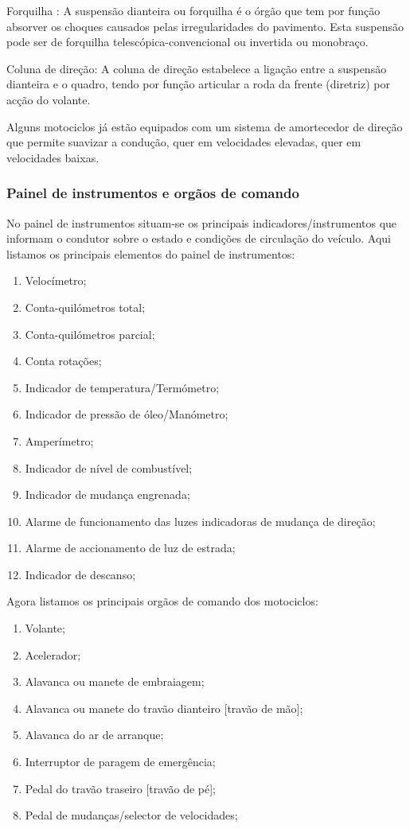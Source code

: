 \documentclass{report}
\begin{document}
Forquilha : A suspensão dianteira ou forquilha  é o órgão que tem por  função absorver os choques causados pelas irregularidades do pavimento.  Esta suspensão pode ser de forquilha  telescópica-convencional ou invertida ou monobraço.

Coluna de direção: A coluna  de direção  estabelece a ligação  entre a suspensão dianteira  e o quadro, tendo por função articular a roda da frente (diretriz)  por acção do volante.

Alguns motociclos  já estão  equipados com um  sistema de amortecedor de direção  que permite  suavizar  a condução, quer em velocidades elevadas, quer em  velocidades baixas.
\subsubsection{Painel de instrumentos e orgãos de comando}
No painel de instrumentos situam-se os principais indicadores/instrumentos  que informam o condutor sobre o estado e condições de circulação do veículo.
Aqui listamos os principais elementos do painel de instrumentos:
\begin{enumerate}
\item Velocímetro;
\item Conta-quilómetros total;
\item Conta-quilómetros parcial;
\item Conta rotações;
\item Indicador de temperatura/Termómetro;
\item Indicador de pressão de óleo/Manómetro;
\item Amperímetro;
\item Indicador de nível de combustível;
\item Indicador de mudança engrenada;
\item Alarme de funcionamento das luzes indicadoras de mudança de direção;
\item Alarme de accionamento de luz de estrada;
\item Indicador de descanso;
\end{enumerate}
Agora listamos os principais orgãos de comando dos motociclos:
\begin{enumerate}
\item Volante;
\item Acelerador;
\item Alavanca ou manete de embraiagem;
\item Alavanca ou manete do travão dianteiro [travão de mão];
\item Alavanca do ar de arranque;
\item Interruptor de paragem  de emergência;
\item Pedal do travão traseiro [travão de pé];
\item Pedal de mudanças/selector de velocidades;
\end{enumerate}
\end{document}
